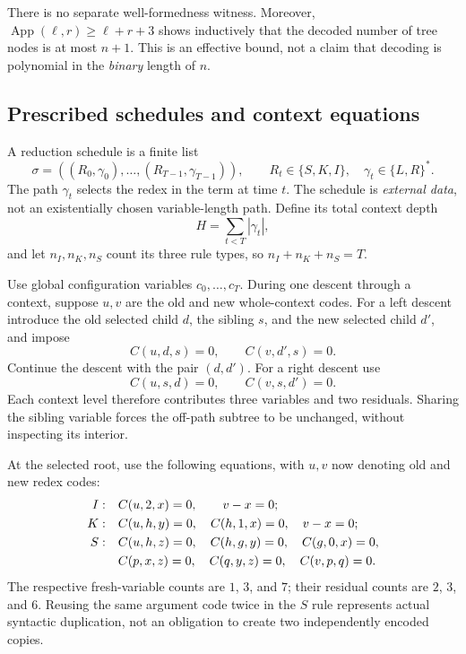 \documentclass[11pt,a4paper]{article}
\theoremstyle{definition}
\theoremstyle{remark}
\newcommand{\App}{\operatorname{App}}
\begin{document}
There is no separate well-formedness witness. Moreover, $\App(\ell,r)\geq\ell+r+3$ shows inductively that the decoded number of tree nodes is at most $n+1$. This is an effective bound, not a claim that decoding is polynomial in the \emph{binary} length of $n$.

\subsection{Prescribed schedules and context equations}
A reduction schedule is a finite list
\[
 \sigma=((R_0,\gamma_0),\ldots,(R_{T-1},\gamma_{T-1})),
 \qquad R_t\in\{S,K,I\},\quad\gamma_t\in\{L,R\}^*.
\]
The path $\gamma_t$ selects the redex in the term at time $t$. The schedule is \emph{external data}, not an existentially chosen variable-length path. Define its total context depth
\[
 H=\sum_{t<T}|\gamma_t|,
\]
and let $n_I,n_K,n_S$ count its three rule types, so $n_I+n_K+n_S=T$.

Use global configuration variables $c_0,\ldots,c_T$. During one descent through a context, suppose $u,v$ are the old and new whole-context codes. For a left descent introduce the old selected child $d$, the sibling $s$, and the new selected child $d'$, and impose
\begin{equation}\label{cdc:wf:eq:left-context}
 C(u,d,s)=0,\qquad C(v,d',s)=0.
\end{equation}
Continue the descent with the pair $(d,d')$. For a right descent use
\begin{equation}\label{cdc:wf:eq:right-context}
 C(u,s,d)=0,\qquad C(v,s,d')=0.
\end{equation}
Each context level therefore contributes three variables and two residuals. Sharing the sibling variable forces the off-path subtree to be unchanged, without inspecting its interior.

At the selected root, use the following equations, with $u,v$ now denoting old and new redex codes:
\begin{align}
 I:\quad & C(u,2,x)=0,\qquad v-x=0;\label{cdc:wf:eq:I-gadget}\\
 K:\quad & C(u,h,y)=0,\quad C(h,1,x)=0,\quad v-x=0;\label{cdc:wf:eq:K-gadget}\\
 S:\quad & C(u,h,z)=0,\quad C(h,g,y)=0,\quad C(g,0,x)=0,\notag\\
 & C(p,x,z)=0,\quad C(q,y,z)=0,\quad C(v,p,q)=0.\label{cdc:wf:eq:S-gadget}
\end{align}
The respective fresh-variable counts are $1$, $3$, and $7$; their residual counts are $2$, $3$, and $6$. Reusing the same argument code twice in the $S$ rule represents actual syntactic duplication, not an obligation to create two independently encoded copies.
\end{document}
